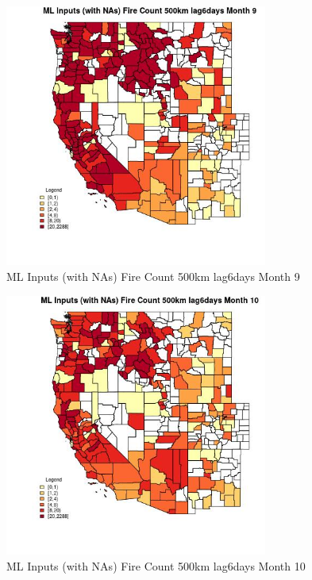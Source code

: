 \begin{figure} 
\centering  
\includegraphics[width=0.77\textwidth]{Code_Outputs/Report_ML_input_PM25_Step4_part_e_de_duplicated_aves_compiled_2019-05-20wNAs_CountyFire_Count_500km_lag6daysmedianMonth9.jpg} 
\caption{\label{fig:Report_ML_input_PM25_Step4_part_e_de_duplicated_aves_compiled_2019-05-20wNAsCountyFire_Count_500km_lag6daysmedianMonth9}ML Inputs (with NAs) Fire Count 500km lag6days Month 9} 
\end{figure} 
 

\begin{figure} 
\centering  
\includegraphics[width=0.77\textwidth]{Code_Outputs/Report_ML_input_PM25_Step4_part_e_de_duplicated_aves_compiled_2019-05-20wNAs_CountyFire_Count_500km_lag6daysmedianMonth10.jpg} 
\caption{\label{fig:Report_ML_input_PM25_Step4_part_e_de_duplicated_aves_compiled_2019-05-20wNAsCountyFire_Count_500km_lag6daysmedianMonth10}ML Inputs (with NAs) Fire Count 500km lag6days Month 10} 
\end{figure} 
 

